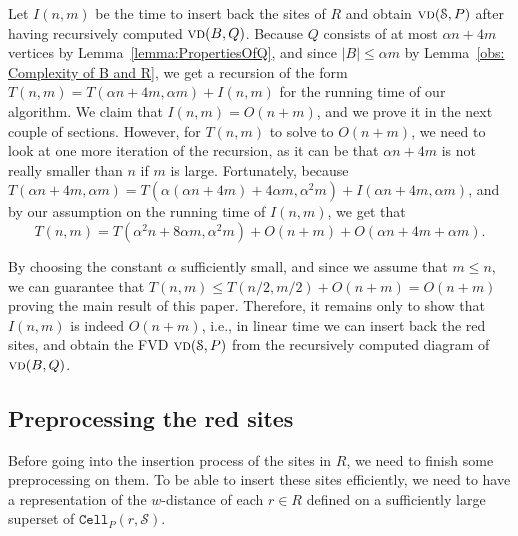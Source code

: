 \documentclass[a4paper,UKenglish]{socg-lipics-v2018}
\newcommand{\s}{\mathcal S}
\newcommand{\cell}[2][P]{\ensuremath{\mathtt{Cell}_{\scriptscriptstyle #1}(#2)}}
\newcommand{\vd}[2][P]{\textsc{vd}(#2, #1)}
\newcommand{\bvd}[2][P]{\textsc{vd}_{\partial}(#2, #1)}
\newcommand{\LL}[1][\s, P]{\ensuremath{\mathcal L_{_{#1}}}}
\newcommand{\A}{\ensuremath{\mathcal A}}
\begin{document}
Let $I(n,m)$ be the time to insert back the sites of $R$ and obtain $\vd{\s}$ after having recursively computed $\vd[Q]{B}$.
Because $Q$ consists of at most $\alpha n + 4m$ vertices by Lemma~\ref{lemma:PropertiesOfQ}, and since $|B|\leq \alpha m$ by Lemma~\ref{obs: Complexity of B and R}, we get a recursion of the form $T(n, m) = T(\alpha n + 4m, \alpha m) + I(n,m)$ for the running time of our algorithm. 
We claim that $I(n,m) = O(n+m)$, and we prove it in the next couple of sections.
However, for $T(n,m)$ to solve to $O(n+ m)$, we need to look at one more iteration of the recursion, as it can be that $\alpha n + 4m$ is not really smaller than $n$ if $m$ is large. 
Fortunately, because $T(\alpha n + 4m, \alpha m) = T(\alpha(\alpha n + 4m) + 4\alpha m, \alpha^2 m) + I(\alpha n + 4m, \alpha m)$, and by our assumption on the running time of $I(n,m)$, we get that
\[T(n,m) = T(\alpha^2 n + 8\alpha m, \alpha^2 m) + O(n+m) + O(\alpha n + 4m + \alpha m).\]

By choosing the constant $\alpha$ sufficiently small, and since we assume that $m\leq n$, we can guarantee that $T(n, m) \leq T(n/2, m/2) + O(n + m) = O(n +m)$ proving the main result of this paper.
Therefore, it remains only to show that $I(n,m)$ is indeed $O(n+ m)$, i.e., in linear time we can insert back the red sites, and obtain the FVD $\vd{\s}$ from the recursively computed diagram of $\vd[Q]{B}$.


\subsection{Preprocessing the red sites}\label{sec: Preprocessing of red sites}
Before going into the insertion process of the sites in $R$, we need to finish some preprocessing on them.
To be able to insert these sites efficiently, we need to have a representation of the $w$-distance of each $r\in R$ defined on a sufficiently large superset of $\cell{r, \s}$. 
\end{document}
